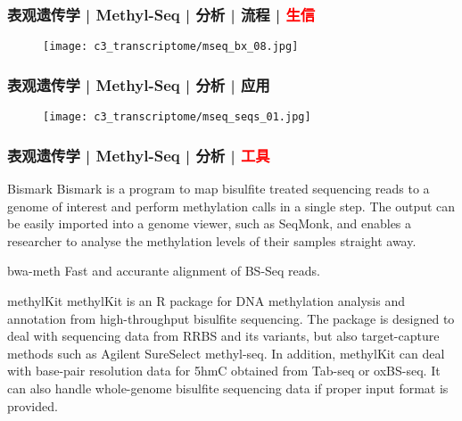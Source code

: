 \begin{frame}
  \frametitle{表观遗传学 | Methyl-Seq | 分析 | 流程 | \textcolor{red}{生信}}
  \begin{figure}
    \centering
    \texttt{[image: c3\_transcriptome/mseq\_bx\_08.jpg]}
  \end{figure}
\end{frame}

\begin{frame}
  \frametitle{表观遗传学 | Methyl-Seq | 分析 | 应用}
  \begin{figure}
    \centering
    \texttt{[image: c3\_transcriptome/mseq\_seqs\_01.jpg]}
  \end{figure}
\end{frame}

\begin{frame}
  \frametitle{表观遗传学 | Methyl-Seq | 分析 | \textcolor{red}{工具}}
  {\footnotesize
  \begin{block}{Bismark}
    Bismark is a program to map bisulfite treated sequencing reads to a genome of interest and perform methylation calls in a single step. The output can be easily imported into a genome viewer, such as SeqMonk, and enables a researcher to analyse the methylation levels of their samples straight away.
  \end{block}
  \pause
  \begin{block}{bwa-meth}
  Fast and accurante alignment of BS-Seq reads.
  \end{block}
  \pause
  \begin{block}{methylKit}
    methylKit is an R package for DNA methylation analysis and annotation from high-throughput bisulfite sequencing. The package is designed to deal with sequencing data from RRBS and its variants, but also target-capture methods such as Agilent SureSelect methyl-seq. In addition, methylKit can deal with base-pair resolution data for 5hmC obtained from Tab-seq or oxBS-seq. It can also handle whole-genome bisulfite sequencing data if proper input format is provided.
  \end{block}
  }
\end{frame}

